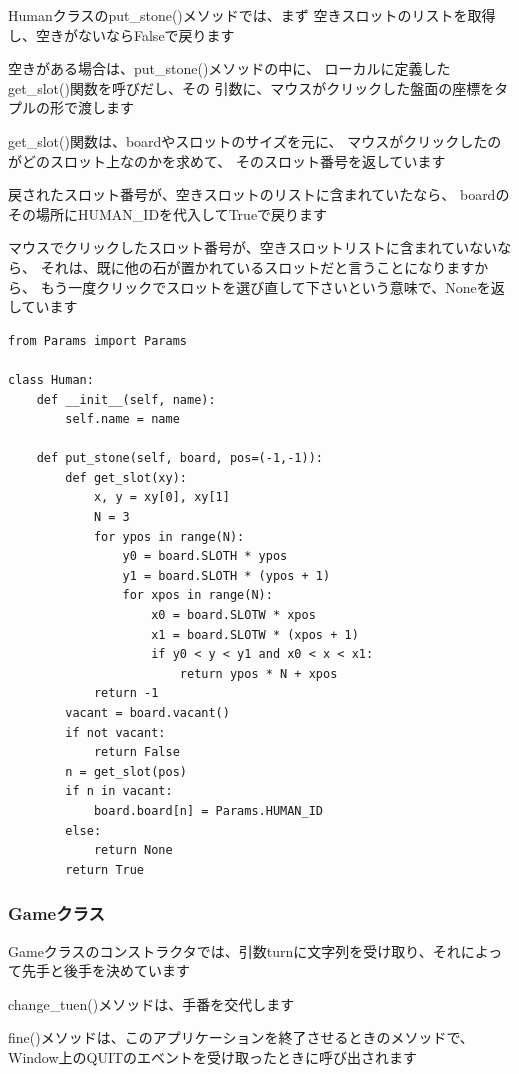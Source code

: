 \documentclass[uplatex,a4paper,11pt,oneside,openany]{jsbook}
\begin{document}
Humanクラスのput\_stone()メソッドでは、まず
空きスロットのリストを取得し、空きがないならFalseで戻ります

空きがある場合は、put\_stone()メソッドの中に、
ローカルに定義したget\_slot()関数を呼びだし、その
引数に、マウスがクリックした盤面の座標をタプルの形で渡します

get\_slot()関数は、boardやスロットのサイズを元に、
マウスがクリックしたのがどのスロット上なのかを求めて、
そのスロット番号を返しています

戻されたスロット番号が、空きスロットのリストに含まれていたなら、
boardのその場所にHUMAN\_IDを代入してTrueで戻ります

マウスでクリックしたスロット番号が、空きスロットリストに含まれていないなら、
それは、既に他の石が置かれているスロットだと言うことになりますから、
もう一度クリックでスロットを選び直して下さいという意味で、Noneを返しています

\begin{lstlisting}[caption=class Human,label=prog05-1]
from Params import Params

class Human:
    def __init__(self, name):
        self.name = name

    def put_stone(self, board, pos=(-1,-1)):
        def get_slot(xy):
            x, y = xy[0], xy[1]
            N = 3
            for ypos in range(N):
                y0 = board.SLOTH * ypos
                y1 = board.SLOTH * (ypos + 1)
                for xpos in range(N):
                    x0 = board.SLOTW * xpos
                    x1 = board.SLOTW * (xpos + 1)
                    if y0 < y < y1 and x0 < x < x1:
                        return ypos * N + xpos
            return -1
        vacant = board.vacant()
        if not vacant:
            return False
        n = get_slot(pos)
        if n in vacant:
            board.board[n] = Params.HUMAN_ID
        else:
            return None
        return True
\end{lstlisting}%

\subsubsection{Gameクラス}

Gameクラスのコンストラクタでは、引数turnに文字列を受け取り、それによって先手と後手を決めています

change\_tuen()メソッドは、手番を交代します

fine()メソッドは、このアプリケーションを終了させるときのメソッドで、Window上のQUITのエベントを受け取ったときに呼び出されます
\end{document}

